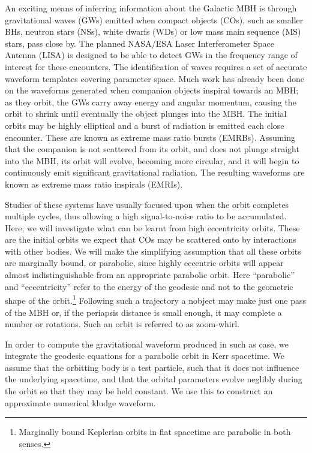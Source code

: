 \documentclass[a4paper, 11pt, titlepage, twoside]{report}
\begin{document}
An exciting means of inferring information about the Galactic MBH is through gravitational waves (GWs) emitted when compact objects (COs), such as smaller BHs, neutron stars (NSs), white dwarfs (WDs) or low mass main sequence (MS) stars, pass close by. The planned NASA/ESA Laser Interferometer Space Antenna (LISA) is designed to be able to detect GWs in the frequency range of interest for these encounters\cite{Bender1998, Danzmann2003}. The identification of waves requires a set of accurate waveform templates covering parameter space. Much work has already been done on the waveforms generated when companion objects inspiral towards an MBH; as they orbit, the GWs carry away energy and angular momentum, causing the orbit to shrink until eventually the object plunges into the MBH. The initial orbits may be highly elliptical and a burst of radiation is emitted each close encounter. These are known as extreme mass ratio bursts (EMRBs)\cite{Rubbo2006}. Assuming that the companion is not scattered from its orbit, and does not plunge straight into the MBH, its orbit will evolve, becoming more circular, and it will begin to continuously emit significant gravitational radiation. The resulting waveforms are known as extreme mass ratio inspirals (EMRIs).

Studies of these systems have usually focused upon when the orbit completes multiple cycles, thus allowing a high signal-to-noise ratio to be accumulated. Here, we will investigate what can be learnt from high eccentricity orbits. These are the initial orbits we expect that COs may be scattered onto by interactions with other bodies. We will make the simplifying assumption that all these orbits are marginally bound, or parabolic, since highly eccentric orbits will appear almost indistinguishable from an appropriate parabolic orbit\cite{Kobayashi2004}. Here ``parabolic'' and ``eccentricity'' refer to the energy of the geodesic and not to the geometric shape of the orbit.\footnote{Marginally bound Keplerian orbits in flat spacetime are parabolic in both senses.} Following such a trajectory a nobject may make just one pass of the MBH or, if the periapsis distance is small enough, it may complete a number or rotations. Such an orbit is referred to as zoom-whirl.

In order to compute the gravitational waveform produced in such as case, we integrate the geodesic equations for a parabolic orbit in Kerr spacetime. We assume that the orbitting body is a test particle, such that it does not influence the underlying spacetime, and that the orbital parameters evolve neglibly during the orbit so that they may be held constant. We use this to construct an approximate numerical kludge waveform\cite{Babak2007}.
\end{document}
